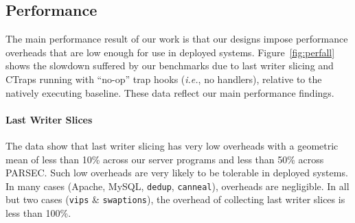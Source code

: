 \documentclass[preprint,9pt]{sigplanconf}
\newcommand{\addtodo}[1]{\textcolor{red}{[To do: #1]}}
\newcommand{\ctraps}{CTraps\xspace}
\begin{document}
%


\subsection{Performance}
\label{sec:eval:perf}

The main performance result of our work is that our designs impose performance
overheads that are low enough for use in deployed systems.
Figure~\ref{fig:perfall} shows the slowdown suffered by our benchmarks due to last writer slicing
and \ctraps running with ``no-op'' trap hooks ({\em i.e.}, no
handlers), relative to the natively executing baseline.  These data reflect
our main performance findings.    

\paragraph{Last Writer Slices}
The data show that last writer slicing has very low overheads with a geometric mean of less
than 10\% across our server programs and less than 50\% across PARSEC.  Such
low overheads are very likely to be tolerable in deployed systems.  In many
cases (Apache, MySQL, {\tt dedup}, {\tt canneal}), overheads are negligible.
In all but two cases ({\tt vips} \& {\tt swaptions}), the overhead of collecting last writer slices is
less than 100\%.    
\end{document}
